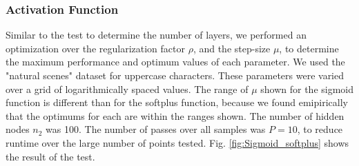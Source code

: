 \documentclass[journal,a4paper,onecolumn,11pt]{IEEEtran}
\begin{document}
\subsubsection{Activation Function}
Similar to the test to determine the number of layers, we performed an optimization over the regularization factor $\rho$, and the step-size $\mu$, to determine the maximum performance and optimum values of each parameter. We used the "natural scenes" dataset for uppercase characters. These parameters were varied over a grid of logarithmically spaced values. The range of $\mu$ shown for the sigmoid function is different than for the softplus function, because we found emipirically that the optimums for each are within the ranges shown. The number of hidden nodes $n_2$ was 100. The number of passes over all samples was $P=10$, to reduce runtime over the large number of points tested. Fig. \ref{fig:Sigmoid_softplus} shows the result of the test.
\end{document}
